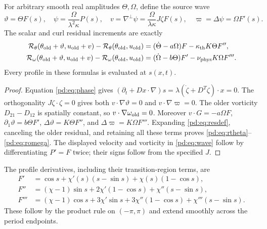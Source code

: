\begin{pdproposition}\label{pd:prop:res}
For arbitrary smooth real amplitudes $\Theta,\Omega$, define the source wave
\begin{equation}\label{pd:eq:wave}
 \vartheta=\Theta F(s),\quad
 \psi=\frac{\Omega}{\lambda^2\kappa}P(s),\quad
 v=\nabla^\perp\psi=\frac{\Omega}{\lambda\kappa}J\zeta F(s),\quad
 \varpi=\Delta\psi=\Omega F'(s).
\end{equation}
The scalar and curl residual increments are exactly
\begin{align}
 \mathcal R_\theta(\theta_{\rm old}+\vartheta,u_{\rm old}+v)
  -\mathcal R_\theta(\theta_{\rm old},u_{\rm old})
   &=(\dot\Theta-a\Omega)F-\kappa_{\rm th} K\Theta F'',\label{pd:eq:rtheta}\\
 \mathcal R_\omega(\theta_{\rm old}+\vartheta,u_{\rm old}+v)
  -\mathcal R_\omega(\theta_{\rm old},u_{\rm old})
   &=(\dot\Omega-b\Theta)F'-\nu_{\rm phys} K\Omega F'''.\label{pd:eq:romega}
\end{align}
Every profile in these formulas is evaluated at $s(x,t)$.
\end{pdproposition}
\begin{proof}
Equation \eqref{pd:eq:phase} gives
$(\partial_t+Dx\cdot\nabla)s=
\lambda(\dot\zeta+D^T\zeta)\cdot x=0$.
The orthogonality $J\zeta\cdot\zeta=0$ gives both
$v\cdot\nabla\vartheta=0$ and $v\cdot\nabla\varpi=0$.
The older vorticity $D_{21}-D_{12}$ is spatially constant, so
$v\cdot\nabla\omega_{\rm old}=0$.
Moreover $v\cdot G=-a\Omega F$,
$\partial_1\vartheta=b\Theta F'$,
$\Delta\vartheta=K\Theta F''$, and
$\Delta\varpi=K\Omega F'''$.
Expanding \eqref{pd:eq:resdef}, canceling the older residual, and retaining all
these terms proves \eqref{pd:eq:rtheta}--\eqref{pd:eq:romega}.
The displayed velocity and vorticity in \eqref{pd:eq:wave} follow by
differentiating $P'=F$ twice; their signs follow from the specified $J$.
\end{proof}

The profile derivatives, including their transition-region terms, are
\begin{align}
 F'&=\cos s+\chi'(s)(s-\sin s)+\chi(s)(1-\cos s),\label{pd:eq:dF}\\
 F''&=(\chi-1)\sin s+2\chi'(1-\cos s)+\chi''(s-\sin s),\label{pd:eq:ddF}\\
 F'''&=(\chi-1)\cos s+3\chi'\sin s
              +3\chi''(1-\cos s)+\chi'''(s-\sin s).\label{pd:eq:dddF}
\end{align}
These follow by the product rule on $(-\pi,\pi)$ and extend smoothly
across the period endpoints.

